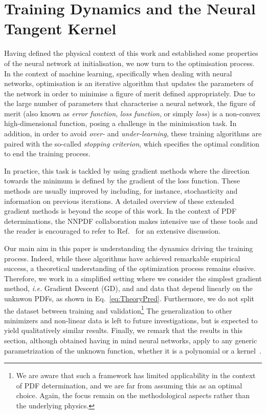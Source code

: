 \section{Training Dynamics and the Neural Tangent Kernel}
\label{sec:Training}

Having defined the physical context of this work and established some properties
of the neural network at initialisation, we now turn to the optimisation
process. In the context of machine learning, specifically when dealing with
neural networks, optimisation is an iterative algorithm that updates the
parameters of the network in order to minimise a figure of merit defined
appropriately. Due to the large number of parameters that characterise a neural
network, the figure of merit (also known as \textit{error function},
\textit{loss function}, or simply \textit{loss}) is a non-convex
high-dimensional function, posing a challenge in the minimisation task. In
addition, in order to avoid \textit{over-} and \textit{under-learning}, these
training algorithms are paired with the so-called \textit{stopping criterion},
which specifies the optimal condition to end the training process.

In practice, this task is tackled by using gradient methods where the direction
towards the minimum is defined by the gradient of the loss function. These
methods are usually improved by including, for instance, stochasticity and
information on previous iterations. A detailed overview of these extended
gradient methods is beyond the scope of this work. In the context of PDF
determinations, the NNPDF collaboration makes intensive use of these tools and
the reader is encouraged to refer to Ref.~\cite{NNPDF:2021njg} for an extensive
discussion.

Our main aim in this paper is understanding the dynamics driving the training
process. Indeed, while these algorithms have achieved remarkable empirical
success, a theoretical understanding of the optimization process remains
elusive. Therefore, we work in a simplified setting where we consider the
simplest gradient method, \textit{i.e.} Gradient Descent (GD), and and data that
depend linearly on the unknwon PDFs, as shown in Eq.~\eqref{eq:TheoryPred}.
Furthermore, we do not split the dataset between training and
validation\footnote{We are aware that such a framework has limited applicability
in the context of PDF determination, and we are far from assuming this as an
optimal choice. Again, the focus remain on the methodological aspects rather
than the underlying physics.} The generalization to other minimizers and
non-linear data is left to future investigations, but is expected to yield
qualitatively similar results. Finally, we remark that the results in this
section, although obtained having in mind neural networks, apply to any generic
parametrization of the unknown function, whether it is a polynomial or a
kernel~\cite{Costantini:2025wxp}.

